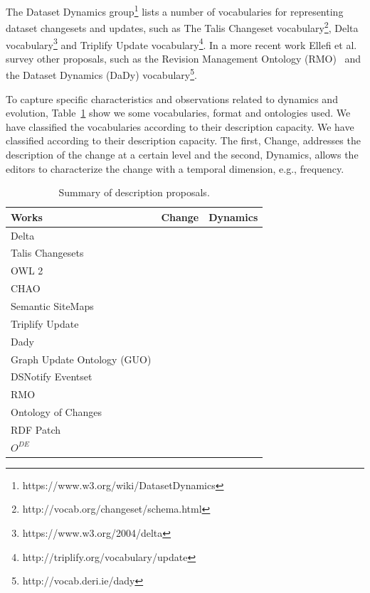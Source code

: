 \documentclass[sw]{iosart2x}
\newcommand{\cmark}{\ding{51}}%
\begin{document}
The Dataset Dynamics group\footnote{https://www.w3.org/wiki/DatasetDynamics} lists a number of vocabularies for representing dataset changesets and updates, such as The Talis Changeset vocabulary\footnote{http://vocab.org/changeset/schema.html}, Delta vocabulary\footnote{https://www.w3.org/2004/delta} and Triplify Update vocabulary\footnote{http://triplify.org/vocabulary/update}. In a more recent work Ellefi et al.~\cite{Ellefi17} survey other proposals, such as the Revision Management Ontology (RMO)~\cite{GraubeHU14} and the Dataset Dynamics (DaDy) vocabulary\footnote{http://vocab.deri.ie/dady}.

To capture specific characteristics and observations related to dynamics and evolution, Table~\ref{tab:vocab} show we some vocabularies, format and ontologies used. We have classified the vocabularies according to their description capacity. We have classified according to their description capacity. The first, Change, addresses the description of the change at a certain level and the second, Dynamics, allows the editors to characterize the change with a temporal dimension, e.g., frequency.

\begin{table}[htbp]
	\centering
	\caption{Summary of description proposals.}
	\begin{tabular}{lcc}
		\hline
		Works & Change & Dynamics \\ \hline
		Delta \cite{Berners04} & \cmark   & \\
		Talis Changesets \cite{TunnicliffeD09} & \cmark   & \\		
		OWL 2 \cite{PalmaHCG08} & \cmark   &  \\
		CHAO \cite{NoyCLM06} & \cmark   & \\	
		Semantic SiteMaps \cite{CyganiakSDDT08} &    & \cmark \\
		Triplify Update \cite{AuerDLHA09} & \cmark   & \\	
		Dady \cite{Dady10} &    & \cmark \\
		Graph Update Ontology (GUO)\footnotemark	 & \cmark   &  \\
		DSNotify Eventset \cite{PopitschH11} & \cmark   & \\		
		RMO \cite{GraubeHU14} & \cmark   &  \\	
		Ontology of Changes \cite{RoussakisCSFS15} & \cmark   &  \\
		RDF Patch\footnotemark  & \cmark   &  \\ 
		$O^{DE}$ \cite{PernelleSMT16} & \cmark   &  \\ 
		\hline
	\end{tabular}%
	\label{tab:vocab}%
\end{table}%
\end{document}
